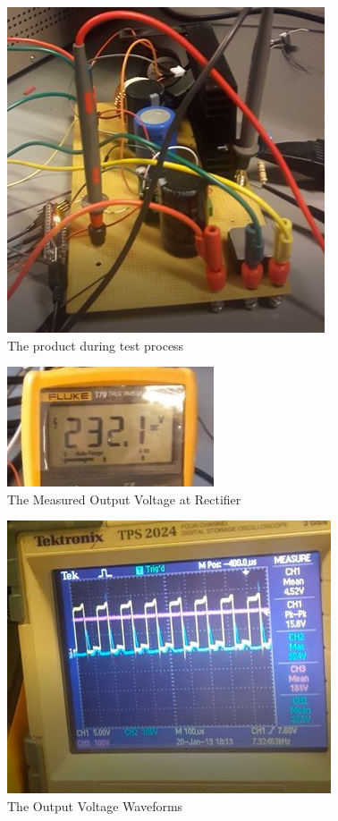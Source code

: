 \documentclass{article}
\begin{document}
\begin{figure}[H]
\centering
\includegraphics[scale=0.6]{devre}
\caption{The product during test process }
\label{fig:members}
\end{figure}


\begin{figure}[H]
\centering
\includegraphics[scale=0.7]{testoutput}
\caption{The Measured Output Voltage at Rectifier}
\label{fig:members}
\end{figure}

\begin{figure}[H]
\centering
\includegraphics[scale=0.6]{testone}
\caption{The Output Voltage Waveforms }
\label{fig:members}
\end{figure}
\end{document}
